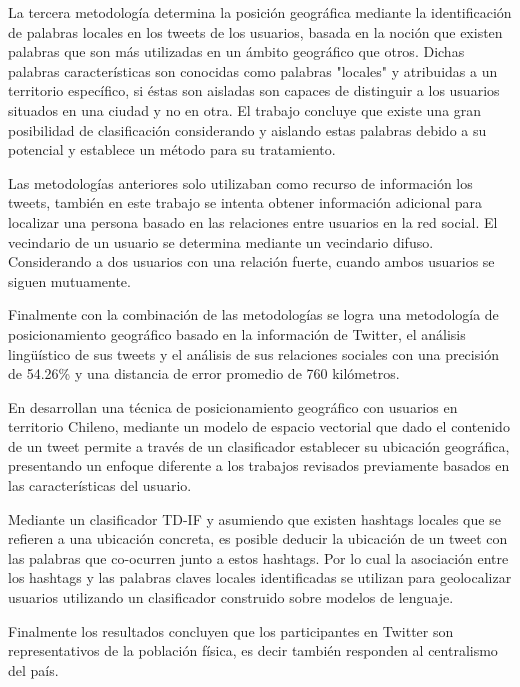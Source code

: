 La tercera metodología determina la posición geográfica mediante la identificación de palabras locales en los tweets de los usuarios, basada en la noción que existen palabras que son más utilizadas en un ámbito geográfico que otros. Dichas palabras características son conocidas como palabras "locales" y atribuidas a un territorio específico, si éstas son aisladas son capaces de distinguir a los usuarios situados en una ciudad y no en otra. El trabajo concluye que existe una gran posibilidad de clasificación considerando y aislando estas palabras debido a su potencial y establece un método para su tratamiento.

Las metodologías anteriores solo utilizaban como recurso de información los tweets, también en este trabajo se intenta obtener información adicional para localizar una persona basado en las relaciones entre usuarios en la red social. El vecindario de un usuario se determina mediante un vecindario difuso. Considerando a dos usuarios con una relación fuerte, cuando ambos usuarios se siguen mutuamente.

Finalmente con la combinación de las metodologías se logra una metodología de posicionamiento geográfico basado en la información de Twitter, el análisis lingüístico de sus tweets y el análisis de sus relaciones sociales con una precisión de 54.26\% y una distancia de error promedio de 760 kilómetros.

En \cite{GraellsGarridoP13} desarrollan una técnica de posicionamiento geográfico con usuarios en territorio Chileno, mediante un modelo de espacio vectorial que dado el contenido de un tweet permite a través de un clasificador establecer su ubicación geográfica, presentando un enfoque diferente a los trabajos revisados previamente basados en las características del usuario. 

Mediante un clasificador TD-IF y asumiendo que existen hashtags locales que se refieren a una ubicación concreta, es posible deducir la ubicación de un tweet con las palabras que co-ocurren junto a estos hashtags. Por lo cual la asociación entre los hashtags y las palabras claves locales identificadas se utilizan para geolocalizar usuarios utilizando un clasificador construido sobre modelos de lenguaje.

Finalmente los resultados concluyen que los participantes en Twitter son representativos de la población física, es decir también responden al centralismo del país.

